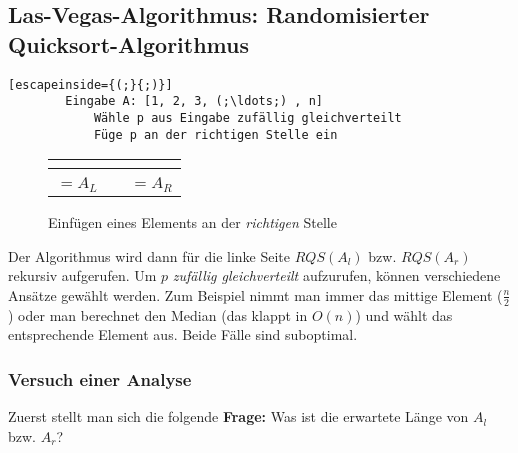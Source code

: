 \documentclass{scrartcl}%
\begin{document}


    \subsection*{Las-Vegas-Algorithmus: Randomisierter Quicksort-Algorithmus}
    \label{subsec:las-vegas-algorithmus:RandomisierterQuicksort-algorithmus}

    \begin{lstlisting}[escapeinside={(;}{;)}]
        Eingabe A: [1, 2, 3, (;\ldots;) , n]
            Wähle p aus Eingabe zufällig gleichverteilt
            Füge p an der richtigen Stelle ein
    \end{lstlisting}

    \begin{figure}[htb]
        \centering

        \begin{tabular}{|C{1.5em}|C{1.5em}|C{1.5em}|C{1.5em}|C{1.5em}|C{1.5em}|C{1.5em}|C{1.5em}|}
            \hline
             &  & \\
            \hline
              & &   \\
              & &  \\
        \end{tabular}

        \caption*{Einfügen eines Elements an der \textit{richtigen} Stelle}
    \end{figure}
    Der Algorithmus wird dann für die linke Seite $RQS(A_l)$ bzw. $RQS(A_r)$ rekursiv aufgerufen.
    Um $p$ \textit{zufällig gleichverteilt} aufzurufen, können verschiedene Ansätze gewählt werden.
    Zum Beispiel nimmt man immer das mittige Element ($\frac{n}{2}$)
    oder man berechnet den Median (das klappt in $O(n)$) und wählt das entsprechende Element aus.
    Beide Fälle sind suboptimal.

    \subsubsection*{Versuch einer Analyse}
    Zuerst stellt man sich die folgende \textbf{\textsf{Frage:}} Was ist die erwartete Länge von $A_l$ bzw. $A_r$?
\end{document}
